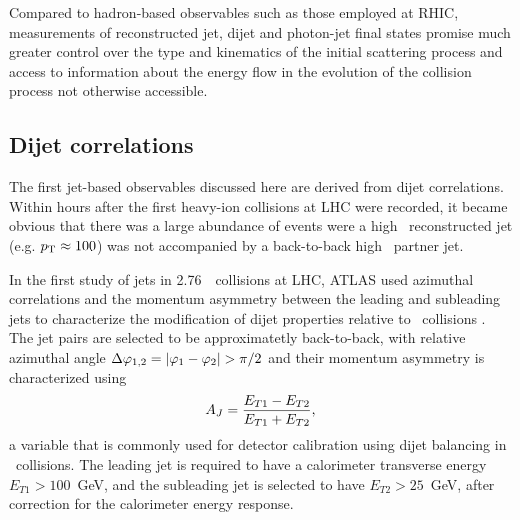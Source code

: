 Compared to hadron-based observables such as those employed at RHIC, measurements of reconstructed
jet, dijet and photon-jet final states promise much greater control over the type and kinematics
of the initial scattering process and access to information about the energy flow in the evolution
of the collision process not otherwise accessible.

\subsection{Dijet correlations}

The first jet-based observables discussed here are derived from dijet correlations. Within hours
after the first heavy-ion collisions at LHC were recorded, it became obvious that there was
a large abundance of events were a high \pT\ reconstructed jet (e.g. $\mbox{$p_{\mathrm{T}}$} \approx 100$\GeVc) was
not accompanied by a back-to-back high \pT\ partner jet.

In the first study of jets in 2.76\TeV\ \PbPb\ collisions at LHC, ATLAS used azimuthal correlations and the
momentum asymmetry between the leading and subleading jets to characterize the modification
of dijet properties relative to \pp\ collisions \cite{Aad:2010bu}.
The jet pairs are selected to be approximatetly back-to-back, with relative 
azimuthal angle $\Delta\varphi_{1,2} =|\varphi_1-\varphi_2| > \pi/2$
and their momentum asymmetry is characterized using
\begin{equation}
A_J = \frac{E_{T1}-E_{T2}}{E_{T1}+E_{T2}},
\end{equation}
a variable that is commonly used for detector calibration using dijet balancing in \pp\ collisions.
The leading jet is required to have a calorimeter transverse energy $E_{T1} > 100$~GeV,
and the subleading jet is selected to have $E_{T2} > 25$~GeV, after correction for
the calorimeter energy response.

